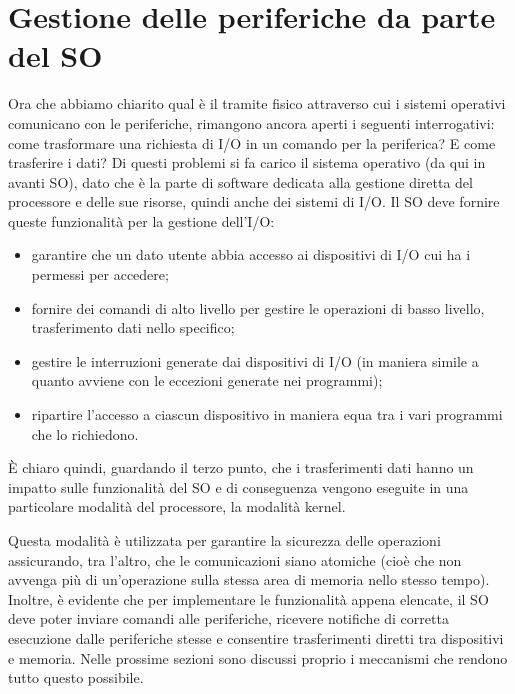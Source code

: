 \documentclass[class=book, crop=false, oneside]{standalone}
\begin{document}
\section{Gestione delle periferiche da parte del SO}
Ora che abbiamo chiarito qual è il tramite fisico attraverso cui i sistemi operativi comunicano con le periferiche, rimangono ancora aperti i seguenti interrogativi: come trasformare una richiesta di I/O in un comando per la periferica? E come trasferire i dati? Di questi problemi si fa carico il sistema operativo (da qui in avanti SO), dato che è la parte di software dedicata alla gestione diretta del processore e delle sue risorse, quindi anche dei sistemi di I/O. Il SO deve fornire queste funzionalità per la gestione dell'I/O:
\begin{itemize}
	\item garantire che un dato utente abbia accesso ai dispositivi di I/O cui ha i permessi per accedere;
	\item fornire dei comandi di alto livello per gestire le operazioni di basso livello, trasferimento dati nello specifico;
	\item gestire le interruzioni generate dai dispositivi di I/O (in maniera simile a quanto avviene con le eccezioni generate nei programmi);
	\item ripartire l'accesso a ciascun dispositivo in maniera equa tra i vari programmi che lo richiedono.
\end{itemize}
È chiaro quindi, guardando il terzo punto, che i trasferimenti dati hanno un impatto sulle funzionalità del SO e di conseguenza vengono eseguite in una particolare modalità del processore, la modalità kernel.

Questa modalità è utilizzata per garantire la sicurezza delle operazioni assicurando, tra l'altro, che le comunicazioni siano atomiche (cioè che non avvenga più di un'operazione sulla stessa area di memoria nello stesso tempo). Inoltre, è evidente che per implementare le funzionalità appena elencate, il SO deve poter inviare comandi alle periferiche, ricevere notifiche di corretta esecuzione dalle periferiche stesse e consentire trasferimenti diretti tra dispositivi e memoria. Nelle prossime sezioni sono discussi proprio i meccanismi che rendono tutto questo possibile.
\end{document}
